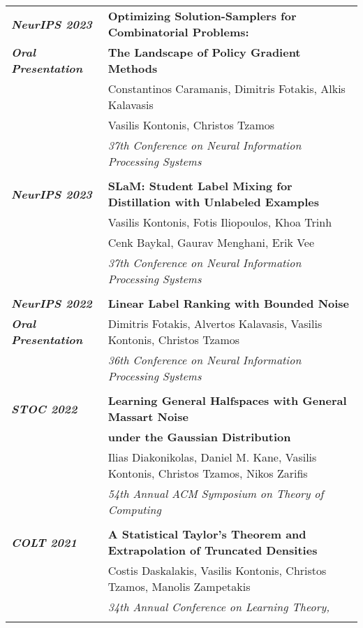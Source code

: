 \documentclass[letterpaper,11pt,oneside]{article}
\begin{document}
\begin{longtable}{@{} l l}
  \emph{\textbf{NeurIPS 2023}}
 &\textbf{Optimizing Solution-Samplers for Combinatorial Problems:}\\
  \emph{\textbf{Oral Presentation}} 
 &\textbf{The Landscape of Policy Gradient Methods}\\
 & Constantinos Caramanis, Dimitris Fotakis, Alkis Kalavasis\\
 & Vasilis Kontonis, Christos Tzamos\\
 & \emph{37th Conference on Neural Information Processing Systems} \\
 & \\

 \emph{\textbf{NeurIPS 2023}}
 &\textbf{SLaM: Student Label Mixing for Distillation with Unlabeled Examples} \\
 & Vasilis Kontonis, Fotis Iliopoulos, Khoa Trinh \\
 & Cenk Baykal, Gaurav Menghani, Erik Vee\\ 
 & \emph{37th Conference on Neural Information Processing Systems} \\
 & \\


  \emph{\textbf{NeurIPS 2022}} &\textbf{Linear Label Ranking with Bounded Noise}\\
  \emph{\textbf{Oral Presentation}} 
 &  Dimitris Fotakis, Alvertos Kalavasis, Vasilis Kontonis, Christos Tzamos \\
 & \emph{36th Conference on Neural Information Processing Systems} \\
 & \\

\emph{\textbf{STOC 2022}}
 &\textbf{Learning General Halfspaces with General Massart Noise}\\
 & \textbf{under the Gaussian Distribution}\\
 & Ilias Diakonikolas, Daniel M. Kane, Vasilis Kontonis,
  Christos Tzamos, Nikos Zarifis \\
 & \emph{54th Annual ACM Symposium on Theory of Computing} \\
 & \\


\emph{\textbf{COLT 2021}}
 &\textbf{A Statistical Taylor's Theorem and Extrapolation of Truncated Densities}\\
 & Costis Daskalakis, Vasilis Kontonis, Christos Tzamos, Manolis Zampetakis \\
 & \emph{34th Annual Conference on Learning Theory, } \\
 & \\


\end{longtable}
\end{document}
